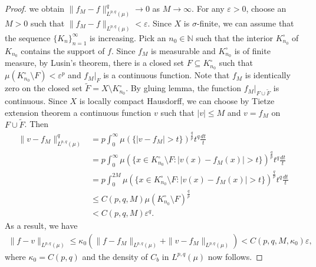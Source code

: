 \documentclass[10pt,reqno]{amsart}
\numberwithin{equation}{section}
\begin{document}
\begin{proof}
we obtain $\|f_{M}-f\|_{L^{p,q}(\mu)}^{q}\rightarrow 0$ as $M\rightarrow\infty$. For any $\varepsilon>0$, choose an $M>0$ such that $\|f_{M}-f\|_{L^{p,q}(\mu)}<\varepsilon$. Since $X$ is $\sigma$-finite, we can assume that the sequence $\{K_{n}\}_{n=1}^{\infty}$ is increasing. Pick an $n_{0}\in\mathbb{N}$ such that the interior $K_{n_{0}}^{\circ}$ of $K_{n_{0}}$ contains the support of $f$. Since $f_{M}$ is measurable and $K_{n_{0}}^{\circ}$ is of finite measure, by Lusin's theorem, there is a closed set $F\subseteq K_{n_{0}}^{\circ}$ such that $\mu(K_{n_{0}}^{\circ}\setminus F)<\varepsilon^{p}$ and $f_{M}|_{F}$ is a continuous function. Note that $f_{M}$ is identically zero on the closed set $\widetilde{F}=X\setminus K_{n_{0}}^{\circ}$. By gluing lemma, the function $f_{M}|_{F\cup\widetilde{F}}$ is continuous. Since $X$ is locally compact Hausdorff, we can choose by Tietze extension theorem a continuous function $v$ such that $|v|\leq M$ and $v=f_{M}$ on $F\cup\widetilde{F}$. Then
\begin{align*}
\|v-f_{M}\|_{L^{p,q}(\mu)}^{q}&=p\int_{0}^{\infty}\mu(\{|v-f_{M}|>t\})^{\frac{q}{p}}t^{q}\frac{dt}{t}\\
&=p\int_{0}^{\infty}\mu(\{x\in K_{n_{0}}^{\circ}\setminus F:|v(x)-f_{M}(x)|>t\})^{\frac{q}{p}}t^{q}\frac{dt}{t}\\
&=p\int_{0}^{2M}\mu(\{x\in K_{n_{0}}^{\circ}\setminus F:|v(x)-f_{M}(x)|>t\})^{\frac{q}{p}}t^{q}\frac{dt}{t}\\
&\leq C(p,q,M)\mu(K_{n_{0}}^{\circ}\setminus F)^{\frac{q}{p}}\\
&<C(p,q,M)\varepsilon^{q}.
\end{align*}
As a result, we have 
\begin{align*}
\|f-v\|_{L^{p,q}(\mu)}\leq\kappa_{0}(\|f-f_{M}\|_{L^{p,q}(\mu)}+\|v-f_{M}\|_{L^{p,q}(\mu)})<C(p,q,M,\kappa_{0})\varepsilon,
\end{align*}
where $\kappa_{0}=C(p,q)$ and the density of $C_{b}$ in $L^{p,q}(\mu)$ now follows.


\end{proof}
\end{document}
